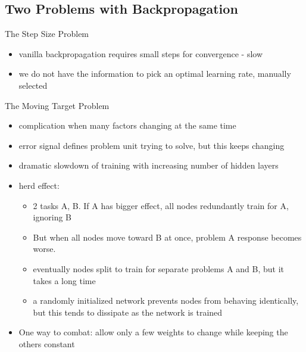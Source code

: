 \documentclass[presentation]{beamer}
\begin{document}
\subsection{Two Problems with Backpropagation}
\label{sec:org168fc30}
\begin{frame}[label={sec:org200ccae}]{The Step Size Problem}
\begin{itemize}
\item vanilla backpropagation requires small steps for convergence - slow
\item we do not have the information to pick an optimal learning rate, manually selected
\end{itemize}
\end{frame}
\begin{frame}[label={sec:orgde08e3c}]{The Moving Target Problem}
\begin{itemize}
\item complication when many factors changing at the same time
\item error signal defines problem unit trying to solve, but this keeps changing
\item dramatic slowdown of training with increasing number of hidden layers
\item herd effect:
\begin{itemize}
\item 2 tasks A, B. If A has bigger effect, all nodes redundantly train for A, ignoring B
\item But when all nodes move toward B at once, problem A response becomes worse.
\item eventually nodes split to train for separate problems A and B, but it takes a long time
\item a randomly initialized network prevents nodes from behaving identically, but this tends to dissipate as the network is trained
\end{itemize}
\item One way to combat: allow only a few weights to change while keeping the others constant
\end{itemize}
\end{frame}
\end{document}

